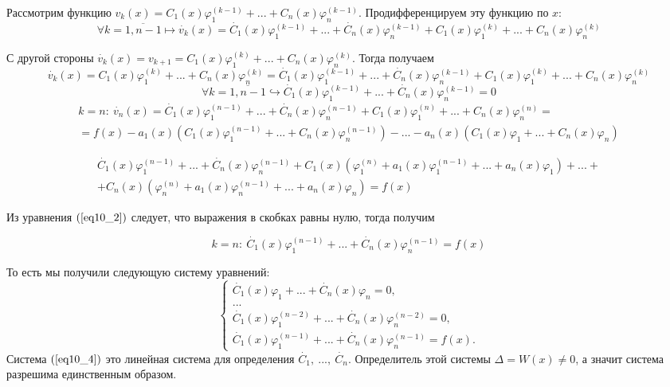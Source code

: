 Рассмотрим функцию $v_k(x) = C_1(x)\varphi_1^{(k-1)} + ... + C_n(x)\varphi_n^{(k-1)}$. Продифференцируем эту функцию по $x$:
\begin{equation}
\forall k =\overline{1, n-1} \longmapsto \dot{v_k}(x) = \dot{C_1}(x)\varphi_1^{(k-1)} + ... + \dot{C_n}(x)\varphi_n^{(k-1)} + C_1(x)\varphi_1^{(k)} + ... + C_n(x)\varphi_n^{(k)}
\end{equation}

С другой стороны $\dot{v_k}(x) = v_{k+1} = C_1(x)\varphi_1^{(k)} + ... + C_n(x)\varphi_n^{(k)}$. Тогда получаем
\begin{equation}
\dot{v_k}(x) = C_1(x)\varphi_1^{(k)} + ... + C_n(x)\varphi_n^{(k)} = \dot{C_1}(x)\varphi_1^{(k-1)} + ... + \dot{C_n}(x)\varphi_n^{(k-1)} + C_1(x)\varphi_1^{(k)} + ... + C_n(x)\varphi_n^{(k)}
\end{equation}
\begin{equation}
\forall k =\overline{1, n-1} \hookrightarrow \dot{C_1}(x)\varphi_1^{(k-1)} + ... + \dot{C_n}(x)\varphi_n^{(k-1)} = 0
\end{equation}
\begin{eqnarray*}
k = n: ~\dot{v_n}(x) = \dot{C_1}(x)\varphi_1^{(n-1)} + ... + \dot{C_n}(x)\varphi_n^{(n-1)} + C_1(x)\varphi_1^{(n)} + ... + C_n(x)\varphi_n^{(n)} = \\ = f(x) - a_1(x)\left(C_1(x)\varphi_1^{(n-1)} + ... + C_n(x)\varphi_n^{(n-1)}\right) - ... - a_n(x)\left(C_1(x)\varphi_1 + ... + C_n(x)\varphi_n\right)
\end{eqnarray*}

\begin{eqnarray*}
\dot{C_1}(x)\varphi_1^{(n-1)} + ... + \dot{C_n}(x)\varphi_n^{(n-1)} + C_1(x)\left(\varphi_1^{(n)} + a_1(x)\varphi_1^{(n-1)} + ... + a_n(x)\varphi_1\right) + ... + \\ + C_n(x)\left(\varphi_n^{(n)} + a_1(x)\varphi_n^{(n-1)} + ... + a_n(x)\varphi_n\right) = f(x)
\end{eqnarray*}

Из уравнения $(\ref{eq10_2})$ следует, что выражения в скобках равны нулю, тогда получим

\[k = n: ~\dot{C_1}(x)\varphi_1^{(n-1)} + ... + \dot{C_n}(x)\varphi_n^{(n-1)} = f(x)\]

То есть мы получили следующую систему уравнений:
\begin{equation}\label{eq10_4}
 \begin{cases}
   \dot{C_1}(x)\varphi_1 + ... + \dot{C_n}(x)\varphi_n = 0, 
   \\
   ...
   \\
   \dot{C_1}(x)\varphi_1^{(n-2)} + ... + \dot{C_n}(x)\varphi_n^{(n-2)} = 0,
   \\
   \dot{C_1}(x)\varphi_1^{(n-1)} + ... + \dot{C_n}(x)\varphi_n^{(n-1)} = f(x).
 \end{cases}
\end{equation}
Система $(\ref{eq10_4})$ это линейная система для определения $\dot{C_1}, ~..., ~\dot{C_n}$.
Определитель этой системы $\Delta = W(x) \neq 0$, а значит система разрешима единственным образом.


